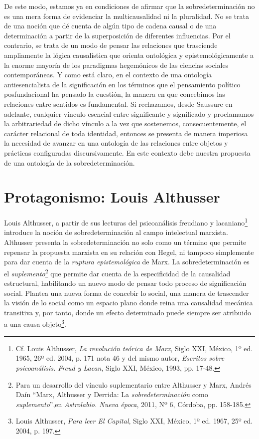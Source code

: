 De este modo, estamos ya en condiciones de afirmar que la
sobredeterminación no es una mera forma de evidenciar la multicausalidad
ni la pluralidad. No se trata de una noción que dé cuenta de algún tipo
de cadena causal o de una determinación a partir de la superposición de
diferentes influencias. Por el contrario, se trata de un modo de pensar
las relaciones que trasciende ampliamente la lógica causalística que
orienta ontológica y epistemológicamente a la enorme mayoría de los
paradigmas hegemónicos de las ciencias sociales contemporáneas. Y como
está claro, en el contexto de una ontología antiesencialista de la
significación en los términos que el pensamiento político posfundacional
ha pensado la cuestión, la manera en que concebimos las relaciones entre
sentidos es fundamental. Si rechazamos, desde Saussure en adelante,
cualquier vínculo esencial entre significante y significado y
proclamamos la arbitrariedad de dicho vínculo a la vez que sostenemos,
consecuentemente, el carácter relacional de toda identidad, entonces se
presenta de manera imperiosa la necesidad de avanzar en una ontología de
las relaciones entre objetos y prácticas configuradas discursivamente.
En este contexto debe nuestra propuesta de una ontología de la
sobredeterminación.

\hypertarget{protagonismo-louis-althusser}{%
\section{Protagonismo: Louis Althusser}\label{protagonismo-louis-althusser}}

Louis Althusser, a partir de sus lecturas del psicoanálisis freudiano y
lacaniano\footnote{Cf. Louis Althusser, \emph{La revolución teórica de
  Marx}, Siglo XXI, México, 1º ed. 1965, 26º ed. 2004, p. 171 nota 46 y
  del mismo autor, \emph{Escritos sobre psicoanálisis. Freud y Lacan},
  Siglo XXI, México, 1993, pp. 17-48.} introduce la noción de
sobredeterminación al campo intelectual marxista. Althusser presenta la
sobredeterminación no solo como un término que permite repensar la
propuesta marxista en su relación con Hegel, ni tampoco simplemente para
dar cuenta de la \emph{ruptura epistemológica} de Marx. La
sobredeterminación es el \emph{suplemento}\footnote{Para un desarrollo
  del vínculo suplementario entre Althusser y Marx, Andrés Daín \enquote{Marx,
  Althusser y Derrida: La \emph{sobredeterminación} como
  \emph{suplemento}},en \emph{Astrolabio. Nueva época}, 2011, Nº 6,
  Córdoba, pp. 158-185.} que permite dar cuenta de la especificidad de
la causalidad estructural, habilitando un nuevo modo de pensar todo
proceso de significación social. Plantea una nueva forma de concebir lo
social, una manera de trascender la visión de lo social como un espacio
plano donde reina una causalidad mecánica transitiva y, por tanto, donde
un efecto determinado puede siempre ser atribuido a una causa
objeto\footnote{Louis Althusser, \emph{Para leer El Capital}, Siglo XXI,
  México, 1º ed. 1967, 25º ed. 2004, p. 197.}.

